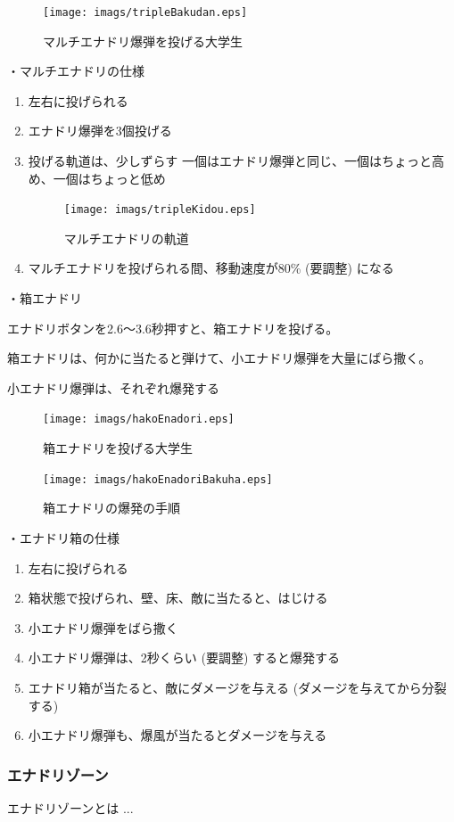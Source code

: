 \documentclass[12pt]{jsarticle}
\begin{document}
\begin{figure}[htbp]
  \begin{center}
    \texttt{[image: imags/tripleBakudan.eps]}
  \end{center}
  \caption{マルチエナドリ爆弾を投げる大学生}
\end{figure}

\newpage

・マルチエナドリの仕様
\begin{enumerate}
  \item 左右に投げられる
  \item エナドリ爆弾を3個投げる
  \item 投げる軌道は、少しずらす
  一個はエナドリ爆弾と同じ、一個はちょっと高め、一個はちょっと低め
  \begin{figure}[htbp]
    \begin{center}
      \texttt{[image: imags/tripleKidou.eps]}
    \end{center}
    \caption{マルチエナドリの軌道}
  \end{figure}
  \item マルチエナドリを投げられる間、移動速度が80\% (要調整) になる
\end{enumerate}

\newpage

・箱エナドリ

エナドリボタンを2.6〜3.6秒押すと、箱エナドリを投げる。

箱エナドリは、何かに当たると弾けて、小エナドリ爆弾を大量にばら撒く。

小エナドリ爆弾は、それぞれ爆発する

\begin{figure}[htbp]
  \begin{center}
    \texttt{[image: imags/hakoEnadori.eps]}
  \end{center}
  \caption{箱エナドリを投げる大学生}
\end{figure}

\begin{figure}[htbp]
  \begin{center}
    \texttt{[image: imags/hakoEnadoriBakuha.eps]}
  \end{center}
  \caption{箱エナドリの爆発の手順}
\end{figure}

\newpage

・エナドリ箱の仕様

\begin{enumerate}
  \item 左右に投げられる
  \item 箱状態で投げられ、壁、床、敵に当たると、はじける
  \item 小エナドリ爆弾をばら撒く
  \item 小エナドリ爆弾は、2秒くらい (要調整) すると爆発する
  \item エナドリ箱が当たると、敵にダメージを与える
  (ダメージを与えてから分裂する)
  \item 小エナドリ爆弾も、爆風が当たるとダメージを与える
\end{enumerate}

\newpage

\subsubsection{エナドリゾーン}

エナドリゾーンとは
...
\end{document}
